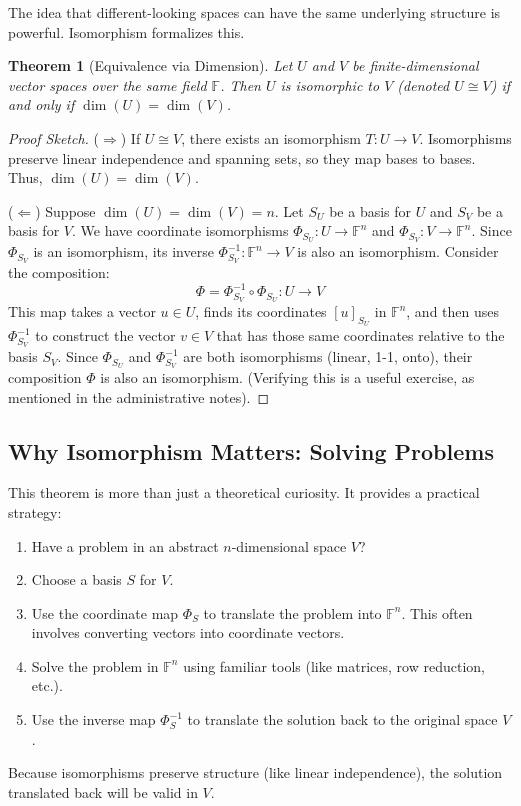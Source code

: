 \documentclass[11pt]{article}
\newtheorem{theorem}{Theorem}[section]
\theoremstyle{definition}
\theoremstyle{remark}
\newcommand{\F}{\mathbb{F}}
\newcommand{\Fn}[1]{\F^{#1}}
\newcommand{\coord}[2]{[#1]_{#2}} %
\begin{document}
The idea that different-looking spaces can have the same underlying structure is powerful. Isomorphism formalizes this.

\begin{theorem}[Equivalence via Dimension]
    Let $U$ and $V$ be finite-dimensional vector spaces over the same field $\F$. Then $U$ is isomorphic to $V$ (denoted $U \cong V$) if and only if $\dim(U) = \dim(V)$.
\end{theorem}

\begin{proof}[Proof Sketch]
    ($\Rightarrow$) If $U \cong V$, there exists an isomorphism $T: U \to V$. Isomorphisms preserve linear independence and spanning sets, so they map bases to bases. Thus, $\dim(U) = \dim(V)$.

    ($\Leftarrow$) Suppose $\dim(U) = \dim(V) = n$. Let $S_U$ be a basis for $U$ and $S_V$ be a basis for $V$. We have coordinate isomorphisms $\Phi_{S_U}: U \to \Fn{n}$ and $\Phi_{S_V}: V \to \Fn{n}$. Since $\Phi_{S_V}$ is an isomorphism, its inverse $\Phi_{S_V}^{-1}: \Fn{n} \to V$ is also an isomorphism.
    Consider the composition:
    \[ \Phi = \Phi_{S_V}^{-1} \circ \Phi_{S_U} : U \to V \]
    This map takes a vector $u \in U$, finds its coordinates $\coord{u}{S_U}$ in $\Fn{n}$, and then uses $\Phi_{S_V}^{-1}$ to construct the vector $v \in V$ that has those same coordinates relative to the basis $S_V$.
    Since $\Phi_{S_U}$ and $\Phi_{S_V}^{-1}$ are both isomorphisms (linear, 1-1, onto), their composition $\Phi$ is also an isomorphism. (Verifying this is a useful exercise, as mentioned in the administrative notes).
\end{proof}

\subsection{Why Isomorphism Matters: Solving Problems}

This theorem is more than just a theoretical curiosity. It provides a practical strategy:
\begin{enumerate}
    \item Have a problem in an abstract $n$-dimensional space $V$?
    \item Choose a basis $S$ for $V$.
    \item Use the coordinate map $\Phi_S$ to translate the problem into $\Fn{n}$. This often involves converting vectors into coordinate vectors.
    \item Solve the problem in $\Fn{n}$ using familiar tools (like matrices, row reduction, etc.).
    \item Use the inverse map $\Phi_S^{-1}$ to translate the solution back to the original space $V$.
\end{enumerate}
Because isomorphisms preserve structure (like linear independence), the solution translated back will be valid in $V$.
\end{document}
